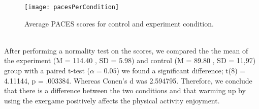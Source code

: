 \begin{figure}[h]
    \centering
    \texttt{[image: pacesPerCondition]}
    \caption{Average PACES scores for control and experiment condition.}
\label{fig:pacesPerCondition}
\end{figure}\\
After performing a normality test on the scores, we compared the the mean of the experiment (M = 114.40 , SD = 5.98) and control (M = 89.80 , SD = 11,97) group with a paired t-test (\begin{math}\alpha = 0.05\end{math})  we found a significant difference; t(8) = 4.11144, p = .003384. Whereas Conen's d was 2.594795. Therefore, we conclude that there is a difference between the two conditions and that warming up by using the exergame positively affects the physical activity enjoyment.
